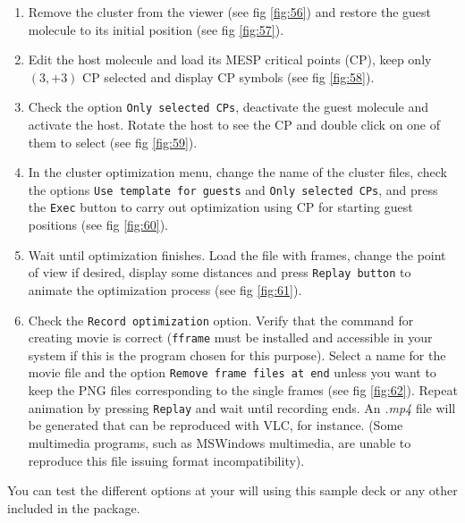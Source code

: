 \documentclass[a4paper,10pt]{article}
\begin{document}
\begin{enumerate}
\item Remove the cluster from the viewer (see fig \ref{fig:56}) 
and restore the guest molecule to its initial position (see fig \ref{fig:57}).

\item Edit the host molecule and load its MESP critical points (CP), 
keep only $(3,+3)$ CP selected and display CP symbols
(see fig \ref{fig:58}).

\item Check the option \texttt{Only selected CPs}, deactivate the 
guest molecule and activate the host. Rotate the host to see 
the CP and double click on one of them to select (see fig \ref{fig:59}).

\item In the cluster optimization menu, change the name of the cluster files, 
check the options \texttt{Use template for guests}
and \texttt{Only selected CPs}, and press the \texttt{Exec} button to carry out optimization using
CP for starting guest positions (see fig \ref{fig:60}).

\item Wait until optimization finishes. Load the file with frames, 
change the point of view if desired, display some distances and press
\texttt{Replay button} to animate the optimization process (see fig \ref{fig:61}).

\item Check the \texttt{Record optimization} option. Verify that the command for creating 
movie is correct (\texttt{fframe} must be installed and accessible in your system
if this is the program chosen for this purpose). Select a name for the movie file and
the option \texttt{Remove frame files at end} unless you want to keep the PNG
files corresponding to the single frames (see fig \ref{fig:62}). 
Repeat animation by pressing \texttt{Replay} and wait until recording ends. 
An {\it *.mp4} file will be generated that can be reproduced
with VLC, for instance. (Some multimedia programs, such as MSWindows multimedia,
are unable to reproduce this file issuing format incompatibility).




\end{enumerate}

You can test the different options at your will using this sample deck or any
other included in the package.

\newpage
\end{document}
